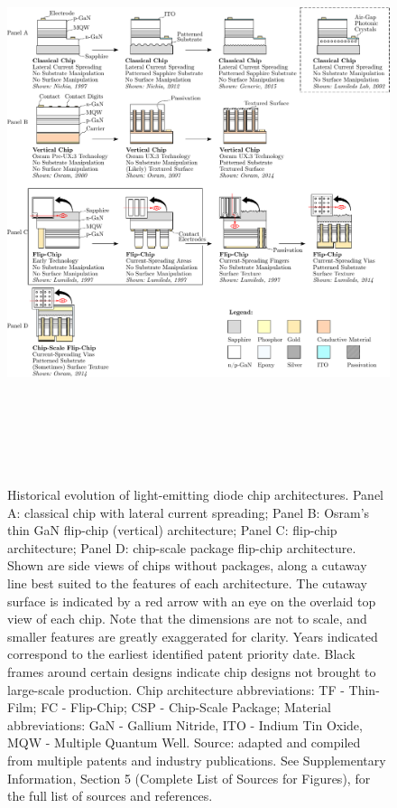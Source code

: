 \documentclass[twoside,twocolumn,9pt]{article}
\begin{document}
\begin{figure}
 \centering
 \includegraphics[height=17cm]{2_SSL_EES/article/figures/chip_architecture_overview.pdf}
 \caption{Historical evolution of light-emitting diode chip architectures. Panel A: classical chip with lateral current spreading; Panel B: Osram’s thin GaN flip-chip (vertical) architecture; Panel C: flip-chip architecture; Panel D: chip-scale package flip-chip architecture. Shown are side views of chips without packages, along a cutaway line best suited to the features of each architecture. The cutaway surface is indicated by a red arrow with an eye on the overlaid top view of each chip. Note that the dimensions are not to scale, and smaller features are greatly exaggerated for clarity. Years indicated correspond to the earliest identified patent priority date. Black frames around certain designs indicate chip designs not brought to large-scale production. Chip architecture abbreviations: TF - Thin-Film; FC - Flip-Chip; CSP - Chip-Scale Package; Material abbreviations: GaN - Gallium Nitride, ITO - Indium Tin Oxide, MQW - Multiple Quantum Well. Source: adapted and compiled from multiple patents and industry publications. See Supplementary Information, Section 5 (Complete List of Sources for Figures), for the full list of sources and references.}
 \label{fgr:chip_architecture_overview}
\end{figure}
\end{document}
